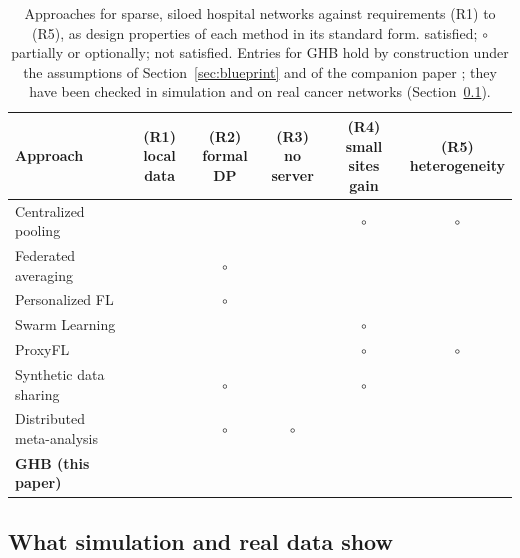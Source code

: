 \documentclass[acmsmall,screen,review]{acmart}
\newcommand{\yes}{\textcolor{famC}{\ding{51}}}
\newcommand{\no}{\textcolor{famO}{\ding{55}}}
\newcommand{\partly}{\textcolor{famT}{$\boldsymbol{\circ}$}}
\theoremstyle{acmdefinition}
\begin{document}
\begin{table}[t]
\caption{Approaches for sparse, siloed hospital networks against requirements (R1) to (R5), as design properties of each method in its standard form. \yes{} satisfied; \partly{} partially or optionally; \no{} not satisfied. Entries for GHB hold by construction under the assumptions of Section~\ref{sec:blueprint} and of the companion paper \cite{simoes2026ghb}; they have been checked in simulation and on real cancer networks (Section~\ref{sec:S8_7}).}
\label{tab:approaches}
\small
\begin{tabularx}{\linewidth}{@{}>{\raggedright\arraybackslash}Xccccc@{}}
\toprule
Approach & \shortstack{(R1)\\local data} & \shortstack{(R2)\\formal DP} & \shortstack{(R3)\\no server} & \shortstack{(R4)\\small sites gain} & \shortstack{(R5)\\heterogeneity}\\
\midrule
Centralized pooling & \no & \no & \no & \partly & \partly\\
Federated averaging \cite{mcmahan2017communication} & \yes & \partly & \no & \no & \no\\
Personalized FL \cite{collins2021exploiting,li2021ditto} & \yes & \partly & \no & \yes & \yes\\
Swarm Learning \cite{warnatherresthal2021swarm} & \yes & \no & \yes & \partly & \no\\
ProxyFL \cite{kalra2023decentralized} & \yes & \yes & \yes & \partly & \partly\\
Synthetic data sharing \cite{jordon2019pate} & \yes & \partly & \yes & \partly & \no\\
Distributed meta-analysis \cite{dersimonian1986meta,duan2020learning} & \yes & \partly & \partly & \yes & \yes\\
\textbf{GHB (this paper)} & \yes & \yes & \yes & \yes & \yes\\
\bottomrule
\end{tabularx}
\end{table}

\subsection{What simulation and real data show}\label{sec:S8_7}
\end{document}
